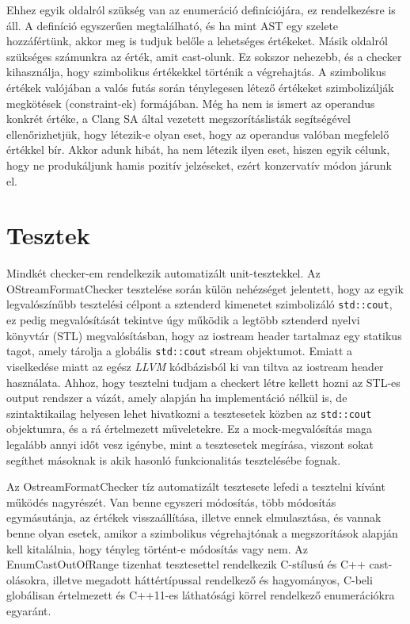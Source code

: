 \documentclass[a4paper,12pt]{report}
\begin{document}
Ehhez egyik oldalról szükség van az enumeráció definíciójára, ez rendelkezésre is áll. A definíció egyszerűen megtalálható, és ha mint AST egy szelete hozzáfértünk, akkor meg is tudjuk belőle a lehetséges értékeket. Másik oldalról szükséges számunkra az érték, amit cast-olunk. Ez sokszor nehezebb, és a checker kihasználja, hogy szimbolikus értékekkel történik a végrehajtás. A szimbolikus értékek valójában a valós futás során ténylegesen létező értékeket szimbolizálják megkötések (constraint-ek) formájában. Még ha nem is ismert az operandus konkrét értéke, a Clang SA által vezetett megszorításlisták segítségével ellenőrizhetjük, hogy létezik-e olyan eset, hogy az operandus valóban megfelelő értékkel bír. Akkor adunk hibát, ha nem létezik ilyen eset, hiszen egyik célunk, hogy ne produkáljunk hamis pozitív jelzéseket, ezért konzervatív módon járunk el.


\chapter{Tesztek}

Mindkét checker-em rendelkezik automatizált unit-tesztekkel. Az OStreamFormatChecker tesztelése során külön nehézséget jelentett, hogy az egyik legvalószínűbb tesztelési célpont a sztenderd kimenetet szimbolizáló \texttt{std::cout}, ez pedig megvalósítását tekintve úgy működik a legtöbb sztenderd nyelvi könyvtár (STL) megvalósításban, hogy az iostream header tartalmaz egy statikus tagot, amely tárolja a globális \texttt{std::cout} stream objektumot. Emiatt a viselkedése miatt az egész \emph{LLVM} kódbázisból ki van tiltva az iostream header használata. Ahhoz, hogy tesztelni tudjam a checkert létre kellett hozni az STL-es output rendszer a vázát, amely alapján ha implementáció nélkül is, de szintaktikailag helyesen lehet hivatkozni a tesztesetek közben az \texttt{std::cout} objektumra, és a rá értelmezett műveletekre. Ez a mock-megvalósítás maga legalább annyi időt vesz igénybe, mint a tesztesetek megírása, viszont sokat segíthet másoknak is akik hasonló funkcionalitás tesztelésébe fognak.

Az OstreamFormatChecker tíz automatizált tesztesete lefedi a tesztelni kívánt működés nagyrészét. Van benne egyszeri módosítás, több módosítás egymásutánja, az értékek visszaállítása, illetve ennek elmulasztása, és vannak benne olyan esetek, amikor a szimbolikus végrehajtónak a megszorítások alapján kell kitalálnia, hogy tényleg történt-e módosítás vagy nem. Az EnumCastOutOfRange tizenhat tesztesettel rendelkezik C-stílusú és C++ cast-olásokra, illetve megadott háttértípussal rendelkező és hagyományos, C-beli globálisan értelmezett és C++11-es láthatósági körrel rendelkező enumerációkra egyaránt.
\end{document}
